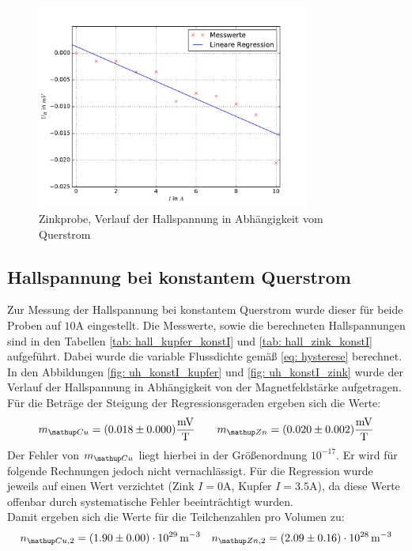 \begin{figure}
  \centering
  \includegraphics[width=0.8\textwidth]{pics/u_h_zink_konstB.pdf}
  \caption{Zinkprobe, Verlauf der Hallspannung in Abhängigkeit vom Querstrom}
  \label{fig: uh_konstB_zink}
\end{figure}


\subsection{Hallspannung bei konstantem Querstrom}
Zur Messung der Hallspannung bei konstantem Querstrom wurde dieser für beide Proben auf $10\si{\ampere}$ eingestellt. Die%
Messwerte, sowie die berechneten Hallspannungen sind in den Tabellen \ref{tab: hall_kupfer_konstI} und \ref{tab: hall_zink_konstI} aufgeführt. Dabei wurde
die variable Flussdichte gemäß \eqref{eq: hysterese} berechnet. In den Abbildungen \ref{fig: uh_konstI_kupfer} und \ref{fig: uh_konstI_zink}
wurde der Verlauf der Hallspannung in Abhängigkeit von der Magnetfeldstärke aufgetragen. Für die Beträge der Steigung der Regressionsgeraden
ergeben sich die Werte:
\begin{equation}
  m\ua{Cu} = (0.018 \pm 0.000)\si{\milli\volt \per \tesla }  \quad \quad m\ua{Zn} = (0.020 \pm 0.002)\si{\milli\volt \per \tesla}%
  \label{eq: steigung_konst_I}
\end{equation}
Der Fehler von $m\ua{Cu}$ liegt hierbei in der Größenordnung $10^{-17}$. Er wird für folgende Rechnungen jedoch nicht vernachlässigt.
Für die Regression wurde jeweils auf einen Wert verzichtet (Zink $I = 0 \si{\ampere}$, Kupfer $I = 3.5\si{\ampere}$), da diese Werte offenbar
durch systematische Fehler beeinträchtigt wurden.\\
Damit ergeben sich die Werte für die Teilchenzahlen pro Volumen zu:
\begin{equation}
  n\ua{Cu,2} = (1.90 \pm 0.00)\cdot 10^{29}\,\si{ \meter^{-3}} \quad n\ua{Zn,2} = (2.09\pm 0.16)\cdot 10^{28}\,\si{ \meter^{-3}}%
\end{equation}

